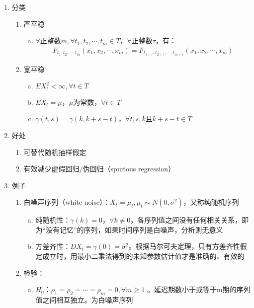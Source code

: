 \documentclass[12pt]{book}
\begin{document}
\begin{enumerate}[1.]
    \item 分类
    \begin{enumerate}[(1)]
        \item 严平稳
        \begin{enumerate}[a.]
            \item $\forall \text{正整数}m,\forall t_1,t_2,⋯,t_m\in T，\forall \text{正整数}\tau$，有：
            \begin{gather*}
                F_{t_1,t_2,⋯,t_m}(x_1,x_2,⋯,x_m)=F_{t_{1+\tau },t_{2+\tau },⋯,t_{m+\tau }}(x_1,x_2,⋯,x_m)
            \end{gather*}
        \end{enumerate}
        \item 宽平稳
        \begin{enumerate}[a.]
            \item $EX_t^2<\infty,\forall t\in T$  
            \item $EX_t=\mu$，$\mu$为常数，$\forall t\in T$  
            \item $\gamma (t,s)=\gamma (k,k+s-t)$，$\forall t,s,k$且$k+s-t\in T$
        \end{enumerate}
    \end{enumerate}
    \item 好处
    \begin{enumerate}
        \item 可替代随机抽样假定
        \item 有效减少虚假回归/伪回归（spurious regression）
    \end{enumerate}
    \item 例子
\begin{enumerate}[(1)]
    \item 白噪声序列（white noise）：$X_t=\mu_t, \mu_t\sim N(0,\sigma^2)$，又称纯随机序列
\begin{enumerate}[a.]
    \item 纯随机性：$\gamma(k)=0，\forall k\neq 0$，各序列值之间没有任何相关关系，即为“没有记忆”的序列，如果时间序列是白噪声，分析则无意义  
    \item 方差齐性：$DX_t=\gamma(0)=\sigma^2$。根据马尔可夫定理，只有方差齐性假定成立时，用最小二乘法得到的未知参数估计值才是准确的、有效的
\end{enumerate}
\item 检验：
    \begin{enumerate}[a.]
        \item $H_0：\rho _1=\rho _2=\cdots =\rho _m=0,\forall m\geqslant 1$ 。延迟期数小于或等于m期的序列值之间相互独立。为白噪声序列  

\end{enumerate}
\end{enumerate}
\end{enumerate}
\end{document}
